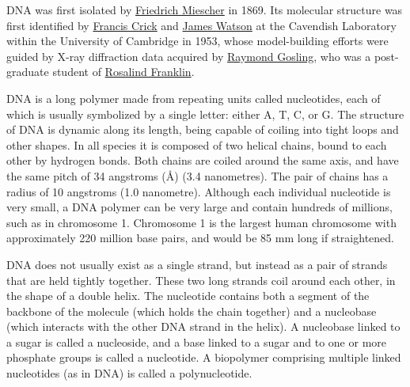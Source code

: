 DNA was first isolated by \href{https://en.wikipedia.org/wiki/Friedrich_Miescher}{Friedrich Miescher} in 1869. Its molecular structure was first identified by \href{https://en.wikipedia.org/wiki/Francis_Crick}{Francis Crick} and \href{https://en.wikipedia.org/wiki/James_Watson}{James Watson} at the Cavendish Laboratory within the University of Cambridge in 1953, whose model-building efforts were guided by X-ray diffraction data acquired by \href{https://en.wikipedia.org/wiki/Raymond_Gosling}{Raymond Gosling}, who was a post-graduate student of \href{https://en.wikipedia.org/wiki/Rosalind_Franklin}{Rosalind Franklin}.

DNA is a long polymer made from repeating units called nucleotides, each of which is usually symbolized by a single letter: either A, T, C, or G. The structure of DNA is dynamic along its length, being capable of coiling into tight loops and other shapes. In all species it is composed of two helical chains, bound to each other by hydrogen bonds. Both chains are coiled around the same axis, and have the same pitch of 34 angstroms (Å) (3.4 nanometres). The pair of chains has a radius of 10 angstroms (1.0 nanometre). Although each individual nucleotide is very small, a DNA polymer can be very large and contain hundreds of millions, such as in chromosome 1. Chromosome 1 is the largest human chromosome with approximately 220 million base pairs, and would be 85 mm long if straightened.

DNA does not usually exist as a single strand, but instead as a pair of strands that are held tightly together. These two long strands coil around each other, in the shape of a double helix. The nucleotide contains both a segment of the backbone of the molecule (which holds the chain together) and a nucleobase (which interacts with the other DNA strand in the helix). A nucleobase linked to a sugar is called a nucleoside, and a base linked to a sugar and to one or more phosphate groups is called a nucleotide. A biopolymer comprising multiple linked nucleotides (as in DNA) is called a polynucleotide.

